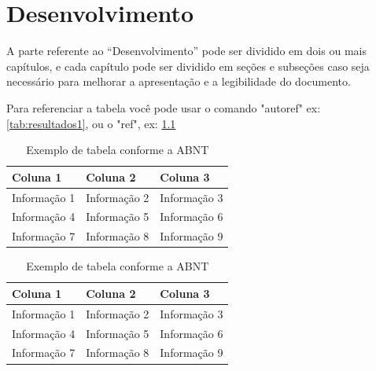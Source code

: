 \chapter{Desenvolvimento} \label{ch:definir-um-label-titulo-de-capitulo}
A parte referente ao ``Desenvolvimento'' pode ser dividido em dois ou mais capítulos, e cada capítulo pode ser dividido em seções e subseções caso seja necessário para melhorar a apresentação e a legibilidade do documento.

Para referenciar a tabela você pode usar o comando "autoref" ex: \autoref{tab:resultados1}, ou o "ref", ex: \ref{tab:resultados1}

\begin{table}[htb]
\centering
\caption{Exemplo de tabela conforme a ABNT}
\label{tab:resultados1}
\begin{tabular}{p{} p{} p{}} %
    \hline
    \textbf{Coluna 1} & \textbf{Coluna 2} & \textbf{Coluna 3} \\
    \hline
    Informação 1 & Informação 2 & Informação 3 \\
    Informação 4 & Informação 5 & Informação 6 \\
    Informação 7 & Informação 8 & Informação 9 \\  
    \hline
\end{tabular}
\end{table}

\begin{table}[htb]
\centering
\caption{Exemplo de tabela conforme a ABNT}
\label{tab:resultados2}
\begin{tabular}{>{\centering\arraybackslash}p{}  >{\centering\arraybackslash}p{}  >{\centering\arraybackslash}p{}} %
    \hline
    \textbf{Coluna 1} & \textbf{Coluna 2} & \textbf{Coluna 3} \\
    \hline
    Informação 1 & Informação 2 & Informação 3 \\
    Informação 4 & Informação 5 & Informação 6 \\
    Informação 7 & Informação 8 & Informação 9 \\  
    \hline
\end{tabular}
\end{table}




